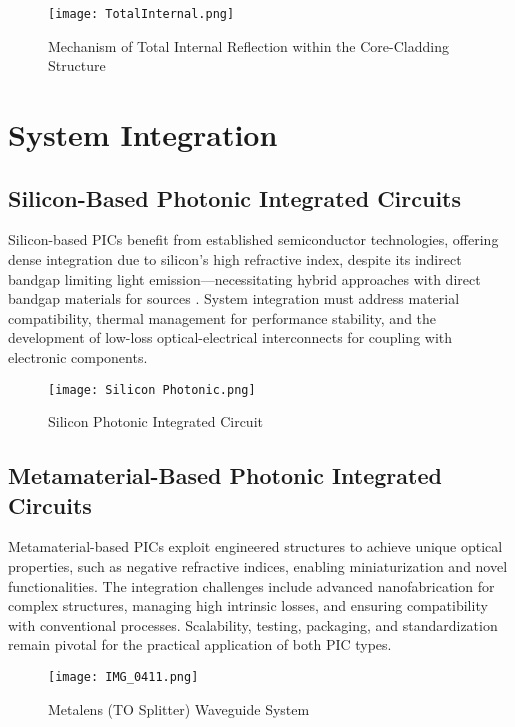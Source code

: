 \documentclass[10pt]{article}
\begin{document}
        \begin{figure}[h]
            \centering
            \texttt{[image: TotalInternal.png]}
            \caption{Mechanism of Total Internal Reflection within the Core-Cladding Structure} 
            \end{figure}
        
        \section{System Integration}
        
\subsection{Silicon-Based Photonic Integrated Circuits}

Silicon-based PICs benefit from established semiconductor technologies, offering dense integration due to silicon's high refractive index, despite its indirect bandgap limiting light emission—necessitating hybrid approaches with direct bandgap materials for sources \cite{ref01}. System integration must address material compatibility, thermal management for performance stability, and the development of low-loss optical-electrical interconnects for coupling with electronic components.

\begin{figure}[h]
    \centering
    \texttt{[image: Silicon Photonic.png]}
    \caption{Silicon Photonic Integrated Circuit} 
    \end{figure}

\subsection{Metamaterial-Based Photonic Integrated Circuits}

Metamaterial-based PICs exploit engineered structures to achieve unique optical properties, such as negative refractive indices, enabling miniaturization and novel functionalities. The integration challenges include advanced nanofabrication for complex structures, managing high intrinsic losses, and ensuring compatibility with conventional processes. Scalability, testing, packaging, and standardization remain pivotal for the practical application of both PIC types.


\begin{figure}[h]
    \centering
    \texttt{[image: IMG\_0411.png]}
    \caption{Metalens (TO Splitter) Waveguide System} 
    \end{figure}
\end{document}
